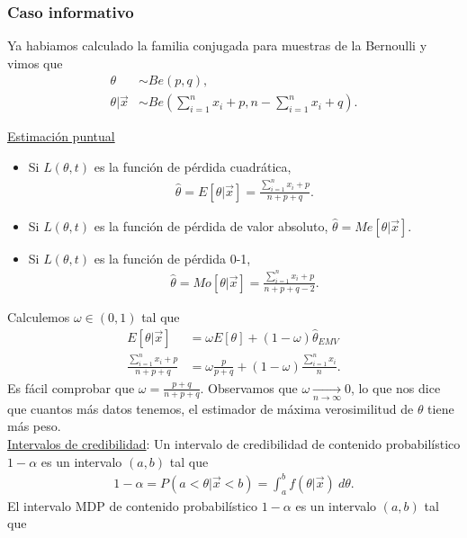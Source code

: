 \subsubsection{Caso informativo}
\noindent Ya habiamos calculado la familia conjugada para muestras de la Bernoulli y vimos que
\begin{align*}
    \theta &\sim Be(p,q), \\
    \theta | \vec{x} &\sim Be\left( \sum_{i=1}^{n} x_i + p, n - \sum_{i=1}^{n} x_i + q \right).
\end{align*}

\noindent \underline{Estimación puntual}
\begin{itemize}
    \item Si $L(\theta,t)$ es la función de pérdida cuadrática, 
    \begin{align*}
        \widehat{\theta} = E[\theta |  \vec{x}] = \frac{\sum_{i=1}^{n} x_i + p}{n + p + q}.
    \end{align*}
    \item Si $L(\theta,t)$ es la función de pérdida de valor absoluto, $\widehat{\theta} = Me[\theta | \vec{x}]$.
    \item Si $L(\theta,t)$ es la función de pérdida 0-1,
    \begin{align*}
        \widehat{\theta} = Mo[\theta | \vec{x}] = \frac{\sum_{i=1}^{n} x_i + p}{n + p + q - 2}.
    \end{align*}
\end{itemize}
Calculemos $\omega \in (0,1)$ tal que 
\begin{align*}
    E[\theta | \vec{x}] &= \omega E[\theta] + (1 - \omega) \widehat{\theta}_{EMV}  \\
    \frac{\sum_{i=1}^{n} x_i + p}{n + p + q} &= \omega \frac{p}{p+q} + (1-\omega) \frac{\sum_{i=1}^{n} x_i}{n}.
\end{align*}
Es fácil comprobar que $\omega = \frac{p+q}{n+p+q}$. Observamos que $\omega \xrightarrow[n \to \infty]{} 0$, lo que nos dice que cuantos más datos tenemos, el estimador de máxima verosimilitud de $\theta$ tiene más peso.
\\
\newline
\noindent \underline{Intervalos de credibilidad}: Un intervalo de credibilidad de contenido probabilístico $1-\alpha$ es un intervalo $(a,b)$ tal que
\begin{align*}
    1 - \alpha = P(a < \theta | \vec{x} < b) = \int_{a}^{b} f(\theta | \vec{x}) \ d\theta.
\end{align*}
El intervalo MDP de contenido probabilístico $1-\alpha$ es un intervalo $(a,b)$ tal que
